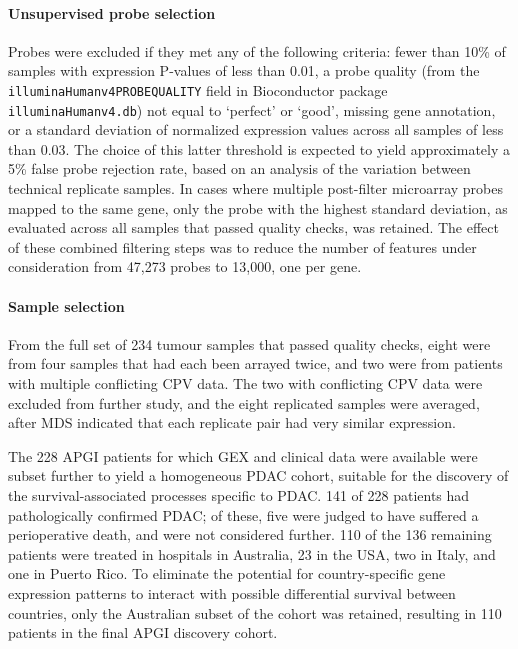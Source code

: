 \documentclass[dissertation.tex]{subfiles}
\begin{document}
\paragraph{Unsupervised probe selection}
Probes were excluded if they met any of the following criteria: fewer than 10\% of samples with expression P-values of less than 0.01, a probe quality (from the \texttt{illuminaHumanv4PROBEQUALITY} field in Bioconductor package \texttt{illuminaHumanv4.db}) not equal to `perfect' or `good', missing gene annotation, or a standard deviation of normalized expression values across all samples of less than 0.03.  The choice of this latter threshold is expected to yield approximately a 5\% false probe rejection rate, based on an analysis of the variation between technical replicate samples.  In cases where multiple post-filter microarray probes mapped to the same gene, only the probe with the highest standard deviation, as evaluated across all samples that passed quality checks, was retained.  The effect of these combined filtering steps was to reduce the number of features under consideration from 47,273 probes to 13,000, one per gene.

\paragraph{Sample selection}  From the full set of 234 tumour samples that passed quality checks, eight were from four samples that had each been arrayed twice, and two were from patients with multiple conflicting \gls{CPV} data.  The two with conflicting \gls{CPV} data were excluded from further study, and the eight replicated samples were averaged, after \gls{MDS} indicated that each replicate pair had very similar expression.

The 228 \gls{APGI} patients for which \gls{GEX} and clinical data were available were subset further to yield a homogeneous \gls{PDAC} cohort, suitable for the discovery of the survival-associated processes specific to \gls{PDAC}.  141 of 228 patients had pathologically confirmed \gls{PDAC}; of these, five were judged to have suffered a perioperative death, and were not considered further.  110 of the 136 remaining patients were treated in hospitals in Australia, 23 in the USA, two in Italy, and one in Puerto Rico.  To eliminate the potential for country-specific gene expression patterns to interact with possible differential survival between countries, only the Australian subset of the cohort was retained, resulting in 110 patients in the final \gls{APGI} discovery cohort.
\end{document}
